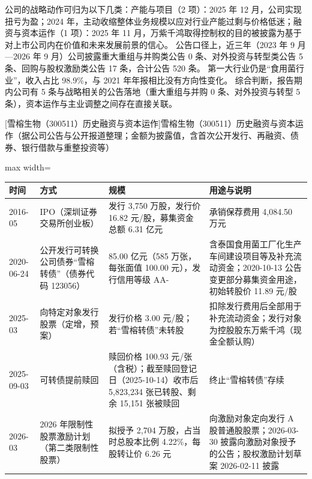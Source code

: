  公司的战略动作可归为以下几类：产能与项目（2 项）：2025 年 12 月，公司实现扭亏为盈；2024 年，主动收缩整体业务规模以应对行业产能过剩与价格低迷；融资与资本运作（1 项）：2025 年 11 月，万紫千鸿取得控制权的目的被披露为基于对上市公司内在价值和未来发展前景的信心。 公告口径上，近三年（2023 年 9 月---2026 年 9 月）公司披露重大重组与并购类公告 0 条、对外投资与转型类公告 5 条、回购与股权激励类公告 17 条，合计公告 520 条。 第一大行业仍是“食用菌行业”，收入占比 98.9\%，与 2021 年年报相比没有方向性变化。 综合判断，报告期内公司有 5 条与战略相关的公告落地（重大重组与并购 0 条、对外投资与转型 5 条），资本运作与主业调整之间存在直接关联。

\begin{center}\small\setlength{\tabcolsep}{4pt}
[雪榕生物（300511）历史融资与资本运作]{雪榕生物（300511）历史融资与资本运作（据公司公告与公开报道整理；金额为披露值，含首次公开发行、再融资、债券、银行借款与重整投资等）}
\begin{adjustbox}{max width=\textwidth}
\begin{tabular}{@{}p{1.45cm}p{2.55cm}p{4.05cm}p{4.95cm}@{}}
\toprule
时间 & 方式 & 规模 & 用途与说明 \\
\midrule
2016-05 & IPO（深圳证券交易所创业板） & 发行 3,\allowbreak{}750 万股，\allowbreak{}发行价 16.82 元/\allowbreak{}股，\allowbreak{}募集资金总额 6.31 亿元 & 承销保荐费用 4,\allowbreak{}084.50 万元 \\
2020-06-24 & 公开发行可转换公司债券“雪榕转债”（债券代码 123056） & 85.00 亿元（585 万张，\allowbreak{}每张面值 100.00 元），\allowbreak{}发行信用等级 AA- & 含泰国食用菌工厂化生产车间建设项目等及补充流动资金；2020-10-13 公告变更部分募集资金用途，\allowbreak{}初始转股价 11.89 元/\allowbreak{}股 \\
2025-03 & 向特定对象发行股票（定增，预案） & 发行价格 3.00 元/\allowbreak{}股；若“雪榕转债”未转股 & 扣除发行费用后全部用于补充流动资金；发行对象为控股股东万紫千鸿（现金全额认购） \\
2025-09-03 & 可转债提前赎回 & 赎回价格 100.93 元/\allowbreak{}张（含税）；截至赎回登记日（2025-10-14）收市后 5,\allowbreak{}823,\allowbreak{}234 张已转股、\allowbreak{}剩余 15,\allowbreak{}151 张被赎回 & 终止“雪榕转债”存续 \\
2026-03 & 2026 年限制性股票激励计划（第二类限制性股票） & 拟授予 2,\allowbreak{}704 万股，\allowbreak{}占当时总股本比例 4.22\%，\allowbreak{}每股转让价 6.26 元 & 向激励对象定向发行 A 股普通股股票；2026-03-30 披露向激励对象授予的公告；股权激励计划草案 2026-02-11 披露 \\
\bottomrule
\end{tabular}
\end{adjustbox}
\end{center}

